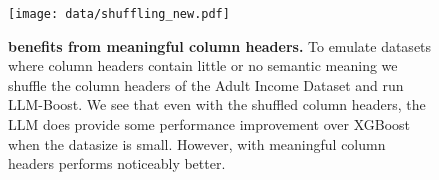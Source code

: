 \begin{figure}[h]
    \centering
    {{\texttt{[image: data/shuffling\_new.pdf]}}}%
    \caption{\textbf{\methodname benefits from meaningful column headers.} To emulate datasets where column headers contain little or no semantic meaning we shuffle the column headers of the Adult Income Dataset and run LLM-Boost. We see that even with the shuffled column headers, the LLM does provide some performance improvement over XGBoost when the datasize is small. However, \methodname with meaningful column headers performs noticeably better.} %
    \label{fig:shuffled}
\end{figure}


